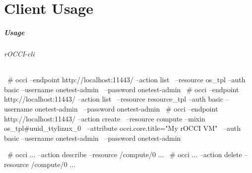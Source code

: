 \part{Client Usage}

\begin{frame}[fragile]
  \frametitle{Usage}
  \framesubtitle{rOCCI-cli}

\begin{terminalbox}{}
~# occi --endpoint http://localhost:11443/ --action list \
        --resource os_tpl --auth basic --username onetest-admin \
        --password onetest-admin
~# occi --endpoint http://localhost:11443/ --action list \
        --resource resource_tpl --auth basic --username onetest-admin \
        --password onetest-admin
~# occi --endpoint http://localhost:11443/ --action create \
        --resource compute --mixin os_tpl#uuid_ttylinux_0 \
        --attribute occi.core.title="My rOCCI VM" \
        --auth basic --username onetest-admin \
        --password onetest-admin

~# occi ... --action describe --resource /compute/0 ...
~# occi ... --action delete --resource /compute/0 ...
\end{terminalbox}

\end{frame}
